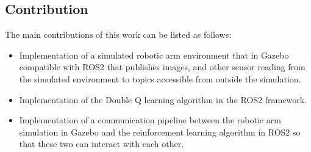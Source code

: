 \documentclass[12pt,oneside]{article}
\begin{document}
   


%
%
%
%

\subsection{Contribution}
The main contributions of this work can be listed as follows:
\begin{itemize}
    \item Implementation of a simulated robotic arm environment that in Gazebo compatible with ROS2 that publishes images, and other sensor reading from the simulated environment to topics accessible from outside the simulation.
    \item Implementation of the Double Q learning algorithm in the ROS2 framework.
    \item Implementation of a communication pipeline between the robotic arm simulation in Gazebo and the reinforcement learning algorithm in ROS2 so that these two can interact with each other.
\end{itemize}
\end{document}
